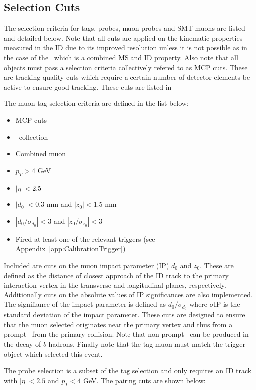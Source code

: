 \subsection{Selection Cuts} \label{sec:CalibrationSelectionCuts}
The selection criteria for tags, probes, muon probes and SMT muons are listed and detailed below. Note that all cuts are applied on the kinematic properties measured in the ID due to its improved resolution unless it is not possible as in the case of the \xsd\ which is a combined MS and ID property. Also note that all objects must pass a selection criteria collectively refered to as MCP cuts. These are tracking quality cuts which require a certain number of detector elements be active to ensure good tracking. These cuts are listed in 

The muon tag selection criteria are defined in the list below:

\begin{itemize}
  \item MCP cuts
  \item \staco\ collection
  \item Combined muon
  \item $p_{T}>$4 GeV
  \item $|\eta|<$2.5
  \item $|d_{0}|<$0.3 mm and $|z_{0}|<$1.5 mm
  \item $|d_{0}/\sigma_{d_{0}}|<$3 and $|z_{0}/\sigma_{z_{0}}|<$3
  \item Fired at least one of the relevant triggers (see Appendix~\ref{app:CalibrationTrigger})
\end{itemize}

Included are cuts on the muon impact parameter (IP) $d_{0}$ and $z_{0}$. These are defined as the distance of closest approach of the ID track to the primary interaction vertex in the transverse and longitudinal planes, respectively. Additionally cuts on the absolute values of IP significances are also implemented. The signifiance of the impact parameter is defined as $d_{0}/\sigma_{d_{0}}$ where $\sigma{\textrm{IP}}$ is the standard deviation of the impact parameter. These cuts are designed to ensure that the muon selected originates near the primary vertex and thus from a prompt \jpsi\ from the primary collision. Note that non-prompt \jpsi\ can be produced in the decay of $b$ hadrons. Finally note that the tag muon must match the trigger object which selected this event.

The probe selection is a subset of the tag selection and only requires an ID track with $|\eta|<2.5$ and $p_{T}<4$ GeV. The pairing cuts are shown below:

